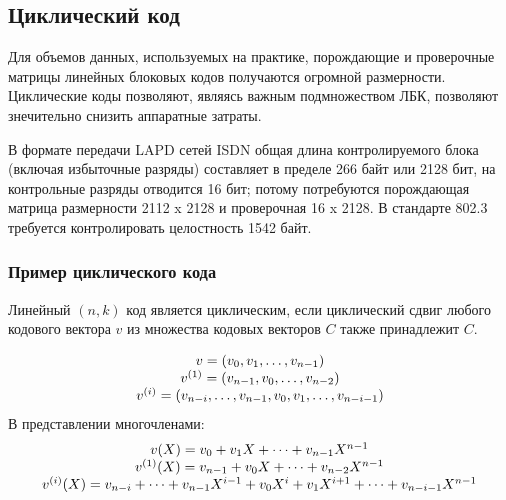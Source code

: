 \subsection{Циклический код}


Для объемов данных, используемых на практике, порождающие и проверочные матрицы линейных блоковых кодов получаются огромной размерности. Циклические коды позволяют, являясь важным подмножеством ЛБК, позволяют знечительно снизить аппаратные затраты.

В формате передачи LAPD сетей ISDN общая длина контролируемого блока (включая избыточные разряды) составляет в пределе 266 байт или 2128 бит, на контрольные разряды отводится 16 бит; потому потребуются порождающая матрица размерности 2112 x 2128 и проверочная 16 x 2128. В стандарте 802.3 требуется контролировать  целостность 1542 байт.


\begin{frame}
    \frametitle{Пример циклического кода}
    \begin{definition}
        \alert{Линейный} $(n,k)$ код является \alert{циклическим}, если циклический сдвиг любого кодового вектора $v$ из множества кодовых векторов $C$ также принадлежит $C$.
    \end{definition}
    \[
        \begin{array}[c]{c}
            v=(v_0,v_1,\ldots,v_{n-1})\\
            v^{(1)}=(v_{n-1},v_0,\ldots,v_{n-2})\\
            v^{(i)}=(v_{n-i},\ldots,v_{n-1},v_0,v_1,\ldots,v_{n-i-1})
        \end{array}
    \]
    В представлении многочленами:
    \[
        \begin{array}[c]{c}
            v(X)=v_0+v_1X+\cdots+v_{n-1}X^{n-1}\\
            v^{(1)}(X)=v_{n-1}+v_0X+\cdots+v_{n-2}X^{n-1}\\
            v^{(i)}(X)=v_{n-i}+\cdots+v_{n-1}X^{i-1}+v_0X^{i}+v_1X^{i+1}+\cdots+v_{n-i-1}X^{n-1}
        \end{array}
    \]
\end{frame}



